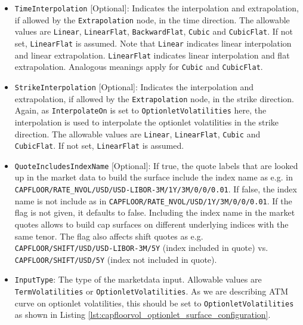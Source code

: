 \begin{itemize}
\item \lstinline!TimeInterpolation! [Optional]:
Indicates the interpolation and extrapolation, if allowed by the \lstinline!Extrapolation! node, in the time direction. The allowable values are \lstinline!Linear!, \lstinline!LinearFlat!, \lstinline!BackwardFlat!, \lstinline!Cubic! and \lstinline!CubicFlat!. If not set, \lstinline!LinearFlat! is assumed. Note that \lstinline!Linear! indicates linear interpolation and linear extrapolation. \lstinline!LinearFlat! indicates linear interpolation and flat extrapolation. Analogous meanings apply for \lstinline!Cubic! and \lstinline!CubicFlat!.

\item \lstinline!StrikeInterpolation! [Optional]:
Indicates the interpolation and extrapolation, if allowed by the \lstinline!Extrapolation! node, in the strike direction. Again, as \lstinline!InterpolateOn! is set to \lstinline!OptionletVolatilities! here, the interpolation is used to interpolate the optionlet volatilities in the strike direction. The allowable values are \lstinline!Linear!, \lstinline!LinearFlat!, \lstinline!Cubic! and \lstinline!CubicFlat!. If not set, \lstinline!LinearFlat! is assumed.

\item \lstinline!QuoteIncludesIndexName! [Optional]:
If true, the quote labels that are looked up in the market data to build the surface include the index name as e.g. in \lstinline!CAPFLOOR/RATE_NVOL/USD/USD-LIBOR-3M/1Y/3M/0/0/0.01!. If false, the index name is not include as in \lstinline!CAPFLOOR/RATE_NVOL/USD/1Y/3M/0/0/0.01!. If the flag is not given, it defaults to false. Including the index name in the market quotes allows to build cap surfaces on different underlying indices with the same tenor. The flag also affects shift quotes as e.g. \lstinline!CAPFLOOR/SHIFT/USD/USD-LIBOR-3M/5Y! (index included in quote) vs. \lstinline!CAPFLOOR/SHIFT/USD/5Y! (index not included in quote).

\item \lstinline!InputType!:
The type of the marketdata input. Allowable values are \lstinline!TermVolatilities! or \lstinline!OptionletVolatilities!. As we are describing ATM curve on optionlet volatilities, this should be set to \lstinline!OptionletVolatilities! as shown in Listing \ref{lst:capfloorvol_optionlet_surface_configuration}.

\end{itemize}

